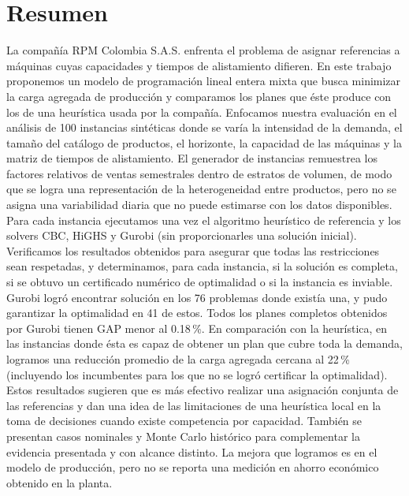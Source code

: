 \documentclass[12pt,a4paper,oneside]{article}
\begin{document}
\section*{Resumen}
La compañía RPM Colombia S.A.S. enfrenta el problema de asignar referencias a máquinas cuyas capacidades y tiempos de alistamiento difieren. En este trabajo proponemos un modelo de programación lineal entera mixta que busca minimizar la carga agregada de producción y comparamos los planes que éste produce con los de una heurística usada por la compañía. Enfocamos nuestra evaluación en el análisis de 100 instancias sintéticas donde se varía la intensidad de la demanda, el tamaño del catálogo de productos, el horizonte, la capacidad de las máquinas y la matriz de tiempos de alistamiento. El generador de instancias remuestrea los factores relativos de ventas semestrales dentro de estratos de volumen, de modo que se logra una representación de la heterogeneidad entre productos, pero no se asigna una variabilidad diaria que no puede estimarse con los datos disponibles. Para cada instancia ejecutamos una vez el algoritmo heurístico de referencia y los solvers CBC, HiGHS y Gurobi (sin proporcionarles una solución inicial). Verificamos los resultados obtenidos para asegurar que todas las restricciones sean respetadas, y determinamos, para cada instancia, si la solución es completa, si se obtuvo un certificado numérico de optimalidad o si la instancia es inviable. Gurobi logró encontrar solución en los 76 problemas donde existía una, y pudo garantizar la optimalidad en 41 de estos. Todos los planes completos obtenidos por Gurobi tienen GAP menor al 0.18\,\%. En comparación con la heurística, en las instancias donde ésta es capaz de obtener un plan que cubre toda la demanda, logramos una reducción promedio de la carga agregada cercana al 22\,\% (incluyendo los incumbentes para los que no se logró certificar la optimalidad). Estos resultados sugieren que es más efectivo realizar una asignación conjunta de las referencias y dan una idea de las limitaciones de una heurística local en la toma de decisiones cuando existe competencia por capacidad. También se presentan casos nominales y Monte Carlo histórico para complementar la evidencia presentada y con alcance distinto. La mejora que logramos es en el modelo de producción, pero no se reporta una medición en ahorro económico obtenido en la planta.
\end{document}
